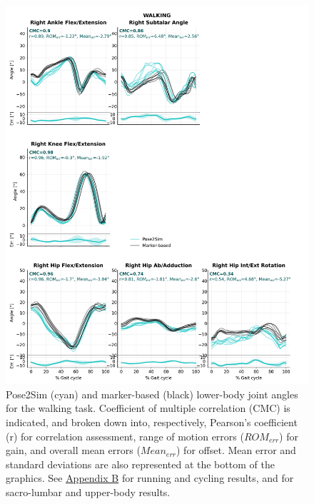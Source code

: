 \clearpage

\begin{figure}[!ht]
	\centering
	\def\svgwidth{1\columnwidth}
	\fontsize{10pt}{10pt}\selectfont
	\includegraphics[height=\dimexpr\textheight-100pt]{"../Chap5/Figures/Fig_QTMWalk.png"}
	\caption{Pose2Sim (cyan) and marker-based (black) lower-body joint angles for the walking task. Coefficient of multiple correlation (CMC) is indicated, and broken down into, respectively, Pearson’s coefficient (r) for correlation assessment, range of motion errors (\(ROM_{err}\)) for gain, and overall mean errors (\(Mean_{err}\)) for offset. Mean error and standard deviations are also represented at the bottom of the graphics. See \hyperref[Ann:2]{Appendix B} for running and cycling results, and for sacro-lumbar and upper-body results. }
	\label{fig_qtmwalk}
\end{figure}

\clearpage


